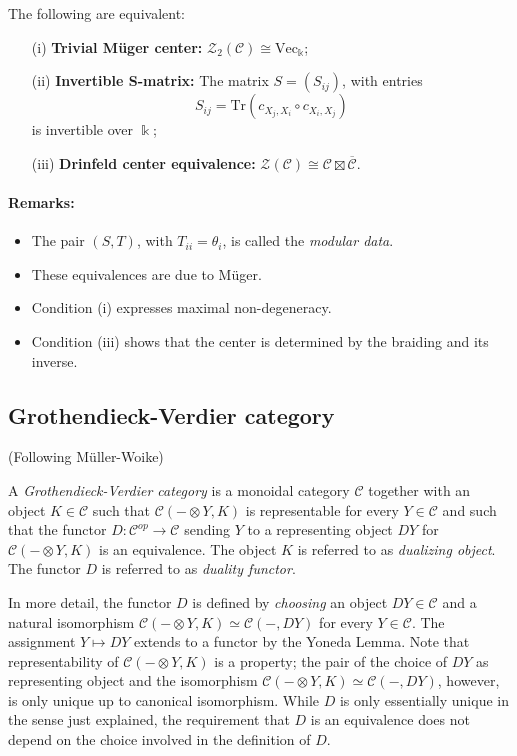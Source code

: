 \documentclass[11pt]{article}
\newcommand{\C}{\mathcal{C}}
\theoremstyle{definition}
\begin{document}
The following are equivalent:
\begin{itemize}
  \item[(i)] \textbf{Trivial M\"uger center:} \( \mathcal{Z}_2(\mathcal{C}) \cong \mathrm{Vec}_{\Bbbk} \);
  \item[(ii)] \textbf{Invertible S-matrix:} The matrix \( S = (S_{ij}) \), with entries
  \[
  S_{ij} = \mathrm{Tr}(c_{X_j, X_i} \circ c_{X_i, X_j})
  \]
  is invertible over \( \Bbbk \);
  \item[(iii)] \textbf{Drinfeld center equivalence:} \( \mathcal{Z}(\mathcal{C}) \cong \mathcal{C} \boxtimes \overline{\mathcal{C}} \).
\end{itemize}


\paragraph{Remarks:}
\begin{itemize}
  \item The pair \( (S, T) \), with \( T_{ii} = \theta_i \), is called the \emph{modular data}.
  \item These equivalences are due to M\"uger.
  \item Condition (i) expresses maximal non-degeneracy.
  \item Condition (iii) shows that the center is determined by the braiding and its inverse.
\end{itemize}



\subsection{Grothendieck-Verdier category}


(Following Müller-Woike)

A \emph{Grothendieck-Verdier category} is a monoidal category $\C$ together with an object $K \in \C$ such that $\C(-\otimes Y, K)$ is representable for every $Y \in \C$ and such that the functor $D : \C^{op} \to \C$ sending $Y$ to a representing object $DY$ for $\C(-\otimes Y, K)$ is an equivalence. The object $K$ is referred to as \emph{dualizing object}. The functor $D$ is referred to as \emph{duality functor}.



In more detail, the functor $D$ is defined by \emph{choosing} an object $DY \in \C$ and a natural isomorphism $\C(-\otimes Y, K) \simeq \C(-,DY)$ for every $Y \in \C$. The assignment $Y \mapsto DY$ extends to a functor by the Yoneda Lemma. Note that representability of $\C(-\otimes Y, K)$ is a property; the pair of the choice of $DY$ as representing object and the isomorphism $\C(-\otimes Y, K) \simeq \C(-,DY)$, however, is only unique up to canonical isomorphism. While $D$ is only essentially unique in the sense just explained, the requirement that $D$ is an equivalence does not depend on the choice involved in the definition of $D$.
\end{document}
